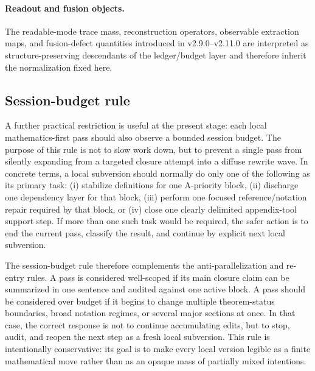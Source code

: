 \paragraph{Readout and fusion objects.}
The readable-mode trace mass, reconstruction operators, observable extraction maps,
and fusion-defect quantities introduced in v2.9.0--v2.11.0 are interpreted as
structure-preserving descendants of the ledger/budget layer and therefore inherit the
normalization fixed here.



\subsection*{Session-budget rule}
A further practical restriction is useful at the present stage: each local mathematics-first pass should also observe a bounded session budget. The purpose of this rule is not to slow work down, but to prevent a single pass from silently expanding from a targeted closure attempt into a diffuse rewrite wave. In concrete terms, a local subversion should normally do only one of the following as its primary task: (i) stabilize definitions for one A-priority block, (ii) discharge one dependency layer for that block, (iii) perform one focused reference/notation repair required by that block, or (iv) close one clearly delimited appendix-tool support step. If more than one such task would be required, the safer action is to end the current pass, classify the result, and continue by explicit next local subversion.

The session-budget rule therefore complements the anti-parallelization and re-entry rules. A pass is considered well-scoped if its main closure claim can be summarized in one sentence and audited against one active block. A pass should be considered over budget if it begins to change multiple theorem-status boundaries, broad notation regimes, or several major sections at once. In that case, the correct response is not to continue accumulating edits, but to stop, audit, and reopen the next step as a fresh local subversion. This rule is intentionally conservative: its goal is to make every local version legible as a finite mathematical move rather than as an opaque mass of partially mixed intentions.



